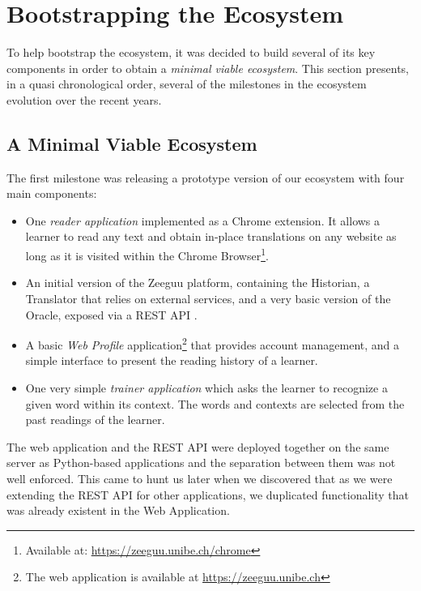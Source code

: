 

\section {Bootstrapping the Ecosystem}

To help bootstrap the ecosystem, it was decided to build several of its key components in order to obtain a {\em minimal viable ecosystem}. This section presents, in a quasi chronological order, several of the milestones in the ecosystem evolution over the recent years. 

\subsection {A Minimal Viable Ecosystem}
The first milestone was releasing a prototype version of our ecosystem with four main components: 

\begin{itemize}
	\item One {\em reader application} implemented as a Chrome extension. It allows a learner to read any text and obtain in-place translations on any website as long as it is visited within the Chrome Browser\footnote{Available at: \url{https://zeeguu.unibe.ch/chrome}}. 

	\item An initial version of the Zeeguu platform, containing the Historian, a Translator that relies on external services, and a very basic version of the Oracle, exposed via a REST API  \cite{Lung16zeeguu}. 

	\item A basic {\em Web Profile} application\footnote{The web application is available at \url{https://zeeguu.unibe.ch}} that provides account management, and a simple interface to present the reading history of a learner. 

	\item One very simple {\em trainer application} which asks the learner to recognize a given word within its context. The words and contexts are selected from the past readings of the learner.

\end{itemize}

The web application and the REST API were deployed together on the same server as Python-based applications and the separation between them was not well enforced. This came to hunt us later when we discovered that as we were extending the REST API for other applications, we duplicated functionality that was already existent in the Web Application.

